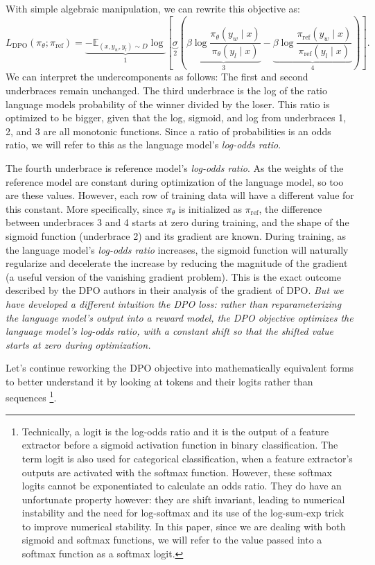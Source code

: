 \documentclass[twoside,11pt]{article}
\begin{document}
With simple algebraic manipulation, we can rewrite this objective as:
\[
  \label{eq:reg}
  L_\mathrm{DPO}(\pi_\theta; \pi_\mathrm{ref}) =
  \underbrace{
  -\mathbb{E}_{(x, y_w, y_l) \sim D} 
  \log }_{1} 
  \left[ 
    \underbrace{\sigma }_{2}
    \left(
    \underbrace{\beta \log \frac{\pi_\theta(y_w \mid x)}{\pi_\theta(y_l \mid x)}}_{3}
    - \underbrace{\beta \log \frac{\pi_\mathrm{ref}(y_w \mid x)}{\pi_\mathrm{ref}(y_l \mid x)}}_{4} 
    \right)
  \right].
\]
We can interpret the undercomponents as follows: 
The first and second underbraces remain unchanged. 
The third underbrace is the log of the ratio
language models probability of the winner divided by the loser. This ratio 
is optimized to be bigger, given that the log, sigmoid, and log from underbraces
1, 2, and 3 are all monotonic functions. Since a ratio of probabilities is
an odds ratio, we will refer to this as the 
language model's \emph{log-odds ratio}. 

The fourth underbrace is reference model's \emph{log-odds ratio}. As
the weights of the reference model are constant during optimization
of the language model, so too are these values. However,
each row of training data will have a different value for this constant. 
More specifically, since $\pi_\theta$ is initialized as $\pi_\mathrm{ref}$, 
the difference between underbraces 3 and 4 starts at zero during training, 
and the shape of the sigmoid function (underbrace 2) and its gradient are
known. During training, as the language model's \emph{log-odds ratio} increases,
the sigmoid function will naturally regularize and decelerate
the increase by reducing the magnitude of the gradient (a 
useful version of the vanishing gradient problem). 
This is the exact outcome described by the DPO authors 
in their analysis of the gradient of DPO. \emph{But we have developed a different
intuition the DPO loss: rather than reparameterizing the language model's
output into a reward model, the DPO objective optimizes the 
language model's log-odds ratio, with a constant shift so that the 
shifted value starts at zero during optimization.}

Let's continue reworking the DPO objective into mathematically
equivalent forms to better understand it by looking at tokens and their logits rather
than sequences \footnote{
  Technically, a logit is the log-odds ratio and it is the output of a 
  feature extractor before a sigmoid activation function in binary
  classification. The term logit is also used for categorical classification,
  when a feature extractor's outputs are 
  activated with the softmax function. However,
  these softmax logits cannot be exponentiated to calculate an odds ratio. 
  They do have an unfortunate property
  however: they are shift invariant, leading to numerical instability and
  the need for log-softmax and its use of the log-sum-exp trick to improve
  numerical stability. In this paper, since we are dealing
  with both sigmoid and softmax functions, we will refer to the value
  passed into a softmax function as a softmax logit.
}. 
\end{document}

